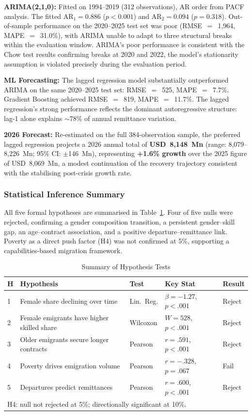 \documentclass[sigconf]{acmart}
\begin{document}
\noindent\textbf{ARIMA(2,1,0):} Fitted on 1994--2019 (312 observations), AR order from PACF analysis. The fitted AR$_1=0.886$ ($p<0.001$) and AR$_2=0.094$ ($p=0.318$). Out-of-sample performance on the 2020--2025 test set was poor (RMSE~$=$~1,964, MAPE~$=$~31.0\%), with ARIMA unable to adapt to three structural breaks within the evaluation window. ARIMA's poor performance is consistent with the Chow test results confirming breaks at 2020 and 2022, the model's stationarity assumption is violated precisely during the evaluation period.

\noindent\textbf{ML Forecasting:} The lagged regression model substantially outperformed ARIMA on the same 2020--2025 test set: RMSE~$=$~525, MAPE~$=$~7.7\%. Gradient Boosting achieved RMSE~$=$~819, MAPE~$=$~11.7\%. The lagged regression's strong performance reflects the dominant autoregressive structure: lag-1 alone explains $\sim$78\% of annual remittance variation.

\noindent\textbf{2026 Forecast:} Re-estimated on the full 384-observation sample, the preferred lagged regression projects a 2026 annual total of \textbf{USD~8,148~Mn} (range: 8,079--8,226~Mn; 95\% CI: $\pm$146~Mn), representing \textbf{+1.6\% growth} over the 2025 figure of USD~8,069~Mn, a modest continuation of the recovery trajectory consistent with the stabilising post-crisis growth rate.

\subsubsection{Statistical Inference Summary}
All five formal hypotheses are summarised in Table~\ref{tab:hypotheses}. Four of five nulls were rejected, confirming a gender composition transition, a persistent gender--skill gap, an age--contract association, and a positive departure--remittance link. Poverty as a direct push factor (H4) was not confirmed at 5\%, supporting a capabilities-based migration framework.

\begin{table}[h]
\centering
\caption{Summary of Hypothesis Tests}
\label{tab:hypotheses}
\small
\begin{tabular}{p{0.3cm}p{3.4cm}p{1.3cm}p{1.3cm}p{0.7cm}}
\toprule
\textbf{H} & \textbf{Hypothesis} & \textbf{Test} & \textbf{Key Stat} & \textbf{Result} \\
\midrule
1 & Female share declining over time   & Lin.\ Reg. & $\beta{=}{-}1.27$, $p{<}.001$ & Reject \\
2 & Female emigrants have higher skilled share & Wilcoxon & $W{=}528$, $p{<}.001$ & Reject \\
3 & Older emigrants secure longer contracts & Pearson & $r{=}.591$, $p{<}.001$ & Reject \\
4 & Poverty drives emigration volume  & Pearson & $r{=}{-}.328$, $p{=}.067$ & Fail \\
5 & Departures predict remittances     & Pearson & $r{=}.600$, $p{<}.001$ & Reject \\
\bottomrule
\multicolumn{5}{l}{\small H4: null not rejected at 5\%; directionally significant at 10\%.}
\end{tabular}
\end{table}
\end{document}
